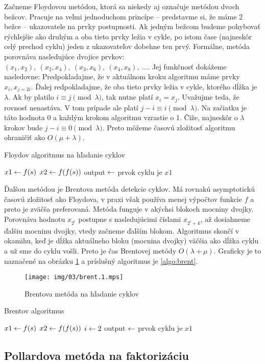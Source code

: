 Začneme Floydovou metódou, ktorá sa niekedy aj označuje metódou dvoch
bežcov. Pracuje na veľmi jednoduchom princípe -- predstavme si, že máme
2 bežce -- ukazovatele na prvky postupnosti. Ak jedným bežcom budeme
pohybovať rýchlejšie ako druhým a oba tieto prvky ležia v cykle, po
istom čase (najneskôr celý prechod cyklu) jeden z ukazovateľov dobehne
ten prvý. Formálne, metóda porovnáva nasledujúce dvojice prvkov:
$(x_1,x_2),\ (x_2,x_4),\ (x_3,x_6),\ (x_4,x_8),\ \dots$.
Jej funkčnosť dokážeme nasledovne: Predpokladajme, že v aktuálnom
kroku algoritmu máme prvky $x_i, x_{j=2i}$. Ďalej redpokladajme,
že oba tieto prvky ležia v cykle, ktorého dĺžka je $\lambda$.
Ak by platilo $i \equiv j \pmod{\lambda}$, tak nutne platí $x_i = x_j$.
Uvažujme teda, že rovnosť nenastáva. V tom prípade ale platí 
$j-i \equiv i \pmod{\lambda}$. Na začiatku je táto hodnota 0 
a každým krokom algoritmu vzrastie o 1. Čiže,
najneskôr o $\lambda$ krokov bude $j-i \equiv 0 \pmod{\lambda}$.
Preto môžeme časovú zložitosť algoritmu ohraničiť ako $O(\mu+\lambda)$.

\begin{algorithm}
    \caption{Floydov algoritmus na hľadanie cyklov}
    \label{algo:floyd}
    $x1 \leftarrow f(s)$\;
    $x2 \leftarrow f(f(s))$\;
    output $\leftarrow$ prvok cyklu je $x1$\;
\end{algorithm}

\medskip
Ďalšou metódou je Brentova metóda detekcie cyklov. Má rovnakú
asymptotickú časovú zložitosť ako Floydova, v praxi však používa menej
výpočtov funkcie $f$ a preto je zväčša preferovaná.
Metóda funguje v akýchsi blokoch mocniny dvojky.
Porovnáva hodnotu $x_{2^i}$ postupne s nasledujúcimi číslami
$x_{2^i+k}$, až dosiahneme ďalšiu mocninu dvojky, vtedy začneme ďalším
blokom. Algoritmus skončí v okamihu, keď je dĺžka aktuálneho bloku
(mocnina dvojky) väčšia ako dĺžka cyklu a už sme do cyklu vošli.
Preto je čas Brentovej metódy $O(\lambda + \mu)$.
Graficky je to naznačené na obrázku \ref{fig:brent} a príslušný
algoritmus je \ref{algo:brent}.

\begin{figure}[h!]
    \centering
    \texttt{[image: img/03/brent.1.mps]}
    \caption{Brentova metóda na hľadanie cyklov}
    \label{fig:brent}
\end{figure}

\begin{algorithm}
    \caption{Brentov algoritmus}
    \label{algo:brent}
    $x1 \leftarrow f(s)$\;
    $x2 \leftarrow f(f(s))$\;
    $i \leftarrow 2$\;
    output $\leftarrow$ prvok cyklu je $x1$\;
\end{algorithm}

\subsection{Pollardova metóda na faktorizáciu}
